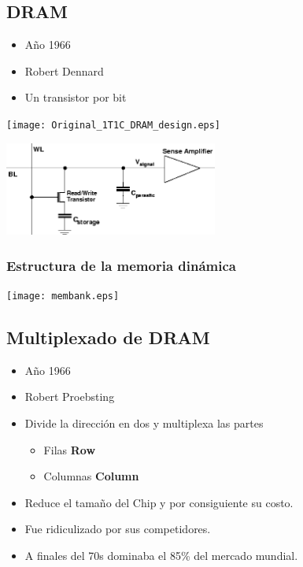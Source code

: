 \documentclass{beamer}
\begin{document}
\subsection{DRAM}
\begin{frame}
\begin{minipage}[c]{6cm}
	\begin{center}
		\begin{itemize}
			\item Año 1966
			\item Robert Dennard
			\item Un transistor por bit
		\end{itemize}
	\end{center}
\end{minipage}
\begin{minipage}[c]{5cm}
	\begin{center}
		\texttt{[image: Original\_1T1C\_DRAM\_design.eps]}
	\end{center}
\end{minipage}
\hfill
\hfill
\begin{center}
	\includegraphics[width=7cm]{onetransistor.png} 
\end{center}
\end{frame}

\begin{frame}
\frametitle{Estructura de la  memoria dinámica}
	\begin{center}
		\texttt{[image: membank.eps]}
	\end{center}
\end{frame}

\subsection{Multiplexado de DRAM}
\begin{frame}
	\begin{itemize}
		\item Año 1966
		\item Robert Proebsting
		\item Divide la dirección en dos y multiplexa las partes
			\begin{itemize}
				\item Filas \textbf{Row}
				\item Columnas \textbf{Column}
			\end{itemize}
		\item Reduce el tamaño del Chip y por consiguiente su costo.
		\item Fue ridiculizado por sus competidores.
		\item A finales del 70s dominaba el 85\% del mercado mundial.
	\end{itemize}
\end{frame}
\end{document}
